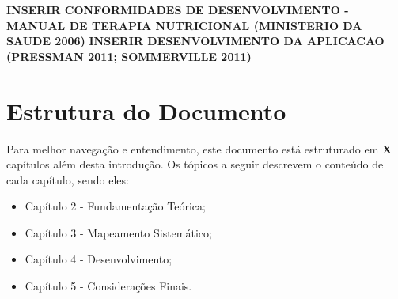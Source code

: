 \textbf{INSERIR CONFORMIDADES DE DESENVOLVIMENTO - MANUAL DE TERAPIA NUTRICIONAL  (MINISTERIO DA SAUDE 2006)}
\textbf{INSERIR DESENVOLVIMENTO DA APLICACAO (PRESSMAN 2011; SOMMERVILLE 2011)}

\section{Estrutura do Documento}\label{sec-divisoes}
Para melhor navegação e entendimento, este documento está estruturado em \textbf{X} capítulos além desta introdução. Os tópicos a seguir descrevem o conteúdo de cada capítulo, sendo eles:
\begin{itemize}
 \item Capítulo 2 - Fundamentação Teórica;

 \item Capítulo 3 - Mapeamento Sistemático;

 \item Capítulo 4 - Desenvolvimento;
 
 \item Capítulo 5 - Considerações Finais.
\end{itemize}